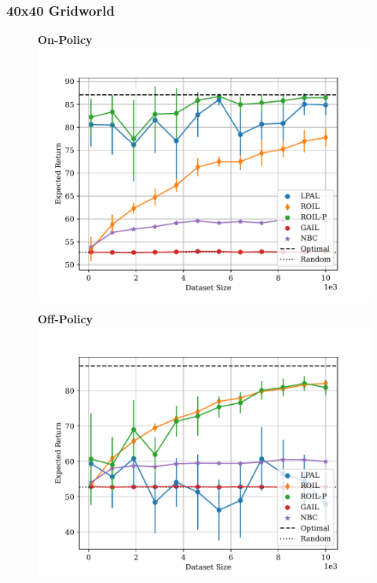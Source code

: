 \documentclass{beamer}
\begin{document}
\begin{frame}
\frametitle{40x40 Gridworld}
\begin{figure}
  \begin{center}
  \begin{minipage}{0.45\linewidth}
    \centering
    \textbf{On-Policy}
    \includegraphics[width=\linewidth]{../../pres_roil/plots/returns/40x40_gridworld_on_policy_returns.pdf}
  \end{minipage}
  \hspace{0.05\linewidth}
  \begin{minipage}{0.45\linewidth}
    \centering
    \textbf{Off-Policy}
    \includegraphics[width=\linewidth]{../../pres_roil/plots/returns/40x40_gridworld_off_policy_returns.pdf}
  \end{minipage}
  \end{center}
\end{figure}
\end{frame}
\end{document}
